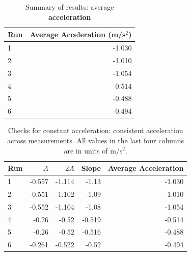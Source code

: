 \begin{table}[ht]
    \centering
    \begin{tabular}{|l|r|}
        \hline
        Run & Average Acceleration (m/s$^{2}$) \\
        \hline
        1 & -1.030 \\
        2 & -1.010 \\
        3 & -1.054 \\
        \hline
        4 & -0.514 \\
        5 & -0.488 \\
        6 & -0.494 \\
        \hline
    \end{tabular}
    \caption{Summary of results: average \textbf{acceleration}}
    \label{table:02.fit.a}
\end{table}
\begin{table}[ht]
    \centering
    \begin{tabular}{|l|r|r|r|r|}
        \hline
        Run & $A$ & $2A$ & Slope & Average Acceleration \\
        \hline
        1 & -0.557 & -1.114 & -1.13 & -1.030 \\
        2 & -0.551 & -1.102 & -1.09 & -1.010 \\
        3 & -0.552 & -1.104 & -1.08 & -1.054 \\
        \hline
        4 & -0.26 & -0.52 & -0.519 & -0.514 \\
        5 & -0.26 & -0.52 & -0.516 & -0.488 \\
        6 & -0.261 & -0.522 & -0.52 & -0.494 \\
        \hline
    \end{tabular}
    \caption{Checks for constant acceleration: consistent acceleration across measurements. All values in the last four columns are in units of m/s$^{2}$.}
    \label{table:02.check.a}
\end{table}

